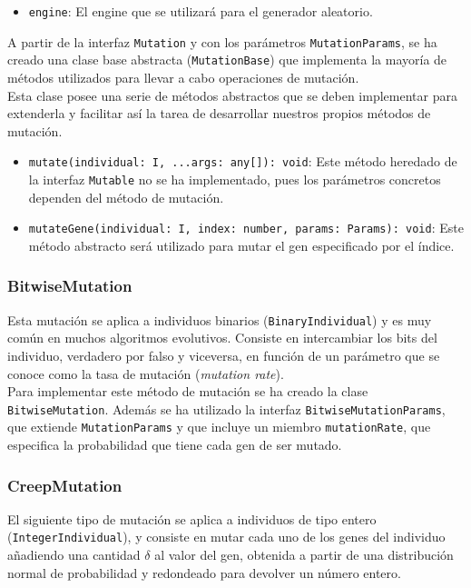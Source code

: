 \begin{itemize}
    \item \texttt{engine}: El engine que se utilizará para el generador aleatorio.
\end{itemize}

A partir de la interfaz \texttt{Mutation} y con los parámetros \texttt{MutationParams}, se ha creado una clase base abstracta (\texttt{MutationBase}) que implementa la mayoría de métodos utilizados para llevar a cabo operaciones de mutación.\\

Esta clase posee una serie de métodos abstractos que se deben implementar para extenderla y facilitar así la tarea de desarrollar nuestros propios métodos de mutación.

\begin{itemize}
    \item \texttt{mutate(individual: I, ...args: any[]): void}: Este método heredado de la interfaz \texttt{Mutable} no se ha implementado, pues los parámetros concretos dependen del método de mutación.
    \item \texttt{mutateGene(individual: I, index: number, params: Params): void}: Este método abstracto será utilizado para mutar el gen especificado por el índice.
\end{itemize}

\subsubsection{BitwiseMutation}

Esta mutación se aplica a individuos binarios (\texttt{BinaryIndividual}) y es muy común en muchos algoritmos evolutivos. Consiste en intercambiar los bits del individuo, verdadero por falso y viceversa, en función de un parámetro que se conoce como la tasa de mutación (\textit{mutation rate}). \\

Para implementar este método de mutación se ha creado la clase \texttt{BitwiseMutation}. Además se ha utilizado la interfaz \texttt{BitwiseMutationParams}, que extiende \texttt{MutationParams} y que incluye un miembro \texttt{mutationRate}, que especifica la probabilidad que tiene cada gen de ser mutado.

\subsubsection{CreepMutation}

El siguiente tipo de mutación se aplica a individuos de tipo entero (\texttt{IntegerIndividual}), y consiste en mutar cada uno de los genes del individuo añadiendo una cantidad $\delta$ al valor del gen, obtenida a partir de una distribución normal de probabilidad y redondeado para devolver un número entero. \\


